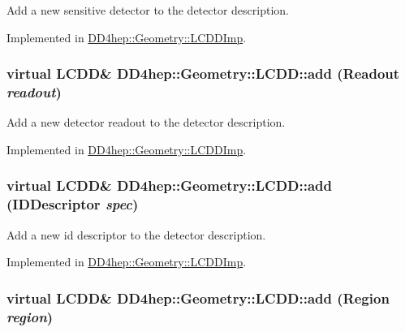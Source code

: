 Add a new sensitive detector to the detector description. 

Implemented in \hyperlink{class_d_d4hep_1_1_geometry_1_1_l_c_d_d_imp_a2b9390272a836536b6ffb8545165f0db}{DD4hep::Geometry::LCDDImp}.\hypertarget{class_d_d4hep_1_1_geometry_1_1_l_c_d_d_a68f3490691ccf2937987fbb60969a70d}{
\subsubsection[{add}]{\setlength{\rightskip}{0pt plus 5cm}virtual {\bf LCDD}\& DD4hep::Geometry::LCDD::add ({\bf Readout} {\em readout})}}
\label{class_d_d4hep_1_1_geometry_1_1_l_c_d_d_a68f3490691ccf2937987fbb60969a70d}


Add a new detector readout to the detector description. 

Implemented in \hyperlink{class_d_d4hep_1_1_geometry_1_1_l_c_d_d_imp_a387c7f1ec836f427515add50ca1c51ad}{DD4hep::Geometry::LCDDImp}.\hypertarget{class_d_d4hep_1_1_geometry_1_1_l_c_d_d_a346e521d7e74531597650fa812394e89}{
\subsubsection[{add}]{\setlength{\rightskip}{0pt plus 5cm}virtual {\bf LCDD}\& DD4hep::Geometry::LCDD::add ({\bf IDDescriptor} {\em spec})}}
\label{class_d_d4hep_1_1_geometry_1_1_l_c_d_d_a346e521d7e74531597650fa812394e89}


Add a new id descriptor to the detector description. 

Implemented in \hyperlink{class_d_d4hep_1_1_geometry_1_1_l_c_d_d_imp_ae03550f5bda6285d2bbf3dfa53919791}{DD4hep::Geometry::LCDDImp}.\hypertarget{class_d_d4hep_1_1_geometry_1_1_l_c_d_d_a618c1268be853682f6da33777aae71a8}{
\subsubsection[{add}]{\setlength{\rightskip}{0pt plus 5cm}virtual {\bf LCDD}\& DD4hep::Geometry::LCDD::add ({\bf Region} {\em region})}}
\label{class_d_d4hep_1_1_geometry_1_1_l_c_d_d_a618c1268be853682f6da33777aae71a8}



